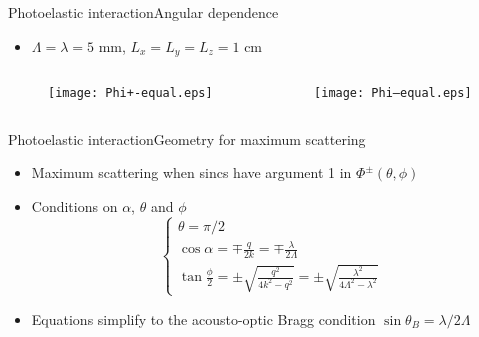 \documentclass[11pt]{beamer}
\begin{document}
	\begin{frame}{Photoelastic interaction}{Angular dependence}
		\begin{itemize}
			\item $\Lambda = \lambda = 5$ mm, $L_x = L_y = L_z = 1$ cm
		\end{itemize}
		\begin{columns}
			\begin{column}{0.5\textwidth}
				\begin{figure}
					\centering
					\texttt{[image: Phi+-equal.eps]}
				\end{figure}
			\end{column}
			\begin{column}{0.5\textwidth}
				\begin{figure}
					\centering
					\texttt{[image: Phi--equal.eps]}
				\end{figure}
			\end{column}
		\end{columns}
	\end{frame}
	
	\begin{frame}{Photoelastic interaction}{Geometry for maximum scattering}
		\pause
		\begin{itemize}
			\item Maximum scattering when sincs have argument 1 in $\Phi^\pm(\theta,\phi)$ \pause
			\item Conditions on $\alpha$, $\theta$ and $\phi$
			\begin{equation*}
				\begin{cases}
					\theta = \pi/2 \\
					\cos{\alpha} = \mp \frac{q}{2k} = \mp \frac{\lambda}{2\Lambda} \\
					\tan{\frac{\phi}{2}} = \pm \sqrt{\frac{q^2}{4k^2-q^2}} = \pm \sqrt{\frac{\lambda^2}{4\Lambda^2-\lambda^2}}
				\end{cases}
			\end{equation*} \pause
			\item Equations simplify to the acousto-optic Bragg condition $\sin{\theta_B} = \lambda/2\Lambda$
		\end{itemize}
	\end{frame}
	
\end{document}
